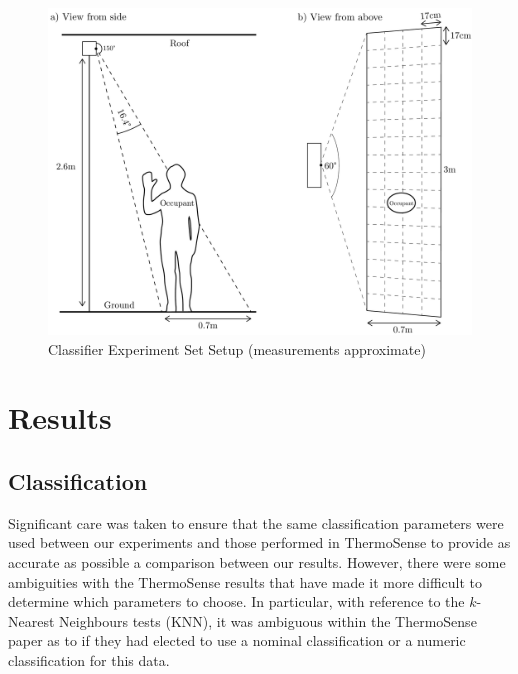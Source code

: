 \documentclass[../thesis/thesis.tex]{subfiles}
\begin{document}
\begin{landscape}
 \begin{figure}
 \centering
 \includegraphics[height=\textheight]{../diagrams/third-exp-setup2.pdf}
 \caption{Classifier Experiment Set Setup (measurements approximate)}
 \label{fig:exps:3setup}
 \end{figure}
\end{landscape}

\section{Results}
\label{sec:results}

\subsection{Classification}
\label{subsec:classification}

Significant care was taken to ensure that the same classification parameters were used between our experiments and those performed in ThermoSense to provide as accurate as possible a comparison between our results. However, there were some ambiguities with the ThermoSense results that have made it more difficult to determine which parameters to choose. In particular, with reference to the $k$-Nearest Neighbours tests (KNN), it was ambiguous within the ThermoSense paper as to if they had elected to use a nominal classification or a numeric classification for this data.
\end{document}
